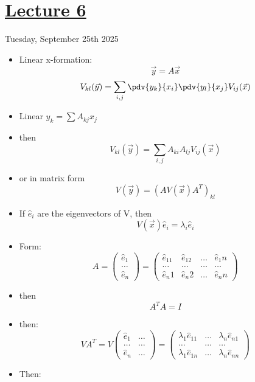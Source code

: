 \section[Lecture6]{\hyperlink{toc}{Lecture 6}}

Tuesday, September 25th 2025

\begin{itemize}
    \item Linear x-formation:
    \[ \vec{y} = A\vec{x} \]
    \[ V_{kl}(\vec{y}) = \sum_{i,j} \pdv{y_k}{x_i} \pdv{y_l}{x_j} V_{ij}(\vec{x}) \]
    \item Linear $y_k = \sum A_{kj} x_j$
    \item then
    \[ V_{kl}(\vec{y}) = \sum_{i,j} A_{ki} A_{lj} V_{ij}(\vec{x}) \]
    \item or in matrix form
    \[ V(\vec{y}) = \left(A V(\vec{x}) A^T\right)_{kl} \]
    \item If $\hat{e}_i$ are the eigenvectors of V, then
    \[ V (\vec{x})\hat{e}_i = \lambda_i \hat{e}_i \]
    \item Form:
    \[ A = \begin{pmatrix}
        \hat{e}_1\\
        \ldots\\
        \hat{e}_n
    \end{pmatrix}
    = \begin{pmatrix}
        \hat{e}_11 & \hat{e}_12 & \ldots & \hat{e}_1n\\
        \ldots & \ldots & \ldots & \ldots\\
        \hat{e}_n1 & \hat{e}_n2 & \ldots & \hat{e}_nn
    \end{pmatrix} \]
    \item then
    \[ A^T A = I \]
    \item then:
    \[ V A^T = V \begin{pmatrix}
        \hat{e}_1 & \ldots \\
        \ldots & \ldots \\
        \hat{e}_n & \ldots
    \end{pmatrix} = \begin{pmatrix}
        \lambda_1 \hat{e}_{11} & \ldots & \lambda_n \hat{e}_{n1} \\
        \ldots & \ldots & \ldots \\
        \lambda_1 \hat{e}_{1n} & \ldots & \lambda_n \hat{e}_{nn}
    \end{pmatrix}\]

    \item Then:
    

\end{itemize}
